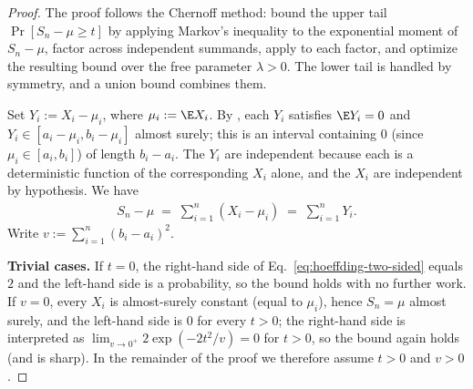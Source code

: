 \begin{proof}
The proof follows the Chernoff method: bound the upper tail $\Pr[S_n - \mu \ge t]$
by applying Markov's inequality to the exponential moment of $S_n - \mu$, factor
across independent summands, apply  to each factor, and
optimize the resulting bound over the free parameter $\lambda > 0$. The lower tail
is handled by symmetry, and a union bound combines them.

Set $Y_i := X_i - \mu_i$, where $\mu_i := \E X_i$. By
, each $Y_i$ satisfies $\E Y_i = 0$ and
$Y_i \in [a_i - \mu_i, b_i - \mu_i]$ almost surely; this is an interval containing
$0$ (since $\mu_i \in [a_i, b_i]$) of length $b_i - a_i$. The $Y_i$ are independent
because each is a deterministic function of the corresponding $X_i$ alone, and the
$X_i$ are independent by hypothesis. We have
\begin{align*}
S_n - \mu \;=\; \sum_{i=1}^n (X_i - \mu_i) \;=\; \sum_{i=1}^n Y_i.
\end{align*}
Write $v := \sum_{i=1}^n (b_i - a_i)^2$.

\smallskip\noindent\textbf{Trivial cases.}
If $t = 0$, the right-hand side of Eq.~\eqref{eq:hoeffding-two-sided} equals $2$
and the left-hand side is a probability, so the bound holds with no further work.
If $v = 0$, every $X_i$ is almost-surely constant (equal to $\mu_i$), hence $S_n =
\mu$ almost surely, and the left-hand side is $0$ for every $t > 0$; the
right-hand side is interpreted as $\lim_{v \to 0^+} 2 \exp(-2t^2/v) = 0$ for $t >
0$, so the bound again holds (and is sharp). In the remainder of the proof we
therefore assume $t > 0$ and $v > 0$.


\end{proof}
